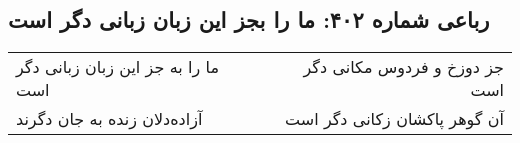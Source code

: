 \begin{center}
\section*{رباعی شماره ۴۰۲: ما را بجز این زبان زبانی دگر است}
\label{sec:0402}
\begin{longtable}{l p{0.5cm} r}
ما را به جز این زبان زبانی دگر است
&&
جز دوزخ و فردوس مکانی دگر است
\\
آزاده‌دلان زنده به جان دگرند
&&
آن گوهر پاکشان زکانی دگر است
\\
\end{longtable}
\end{center}
